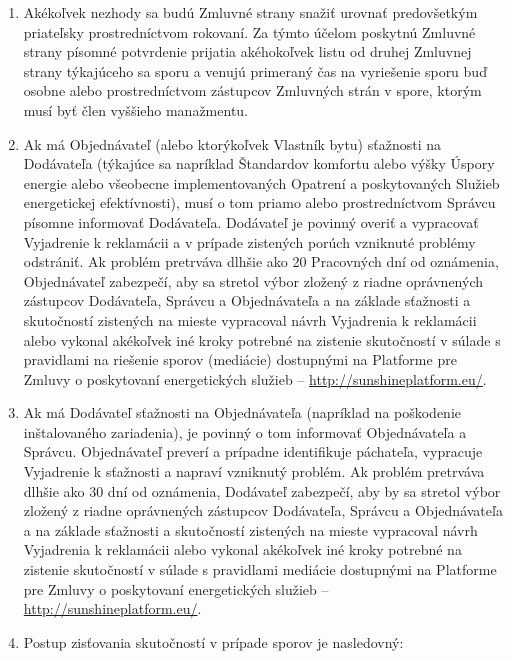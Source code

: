 \begin{multicols}{2}
\begin{enumerate}
\def\labelenumi{\arabic{enumi}.}
\item
  Akékoľvek nezhody sa budú Zmluvné strany snažiť urovnať predovšetkým
  priateľsky prostredníctvom rokovaní. Za týmto účelom poskytnú Zmluvné
  strany písomné potvrdenie prijatia akéhokoľvek listu od druhej
  Zmluvnej strany týkajúceho sa sporu a venujú primeraný čas na
  vyriešenie sporu buď osobne alebo prostredníctvom zástupcov Zmluvných
  strán v spore, ktorým musí byť člen vyššieho manažmentu.
\item
  Ak má Objednávateľ (alebo ktorýkoľvek Vlastník bytu) sťažnosti na
  Dodávateľa (týkajúce sa napríklad Štandardov komfortu alebo výšky
  Úspory energie alebo všeobecne implementovaných Opatrení a
  poskytovaných Služieb energetickej efektívnosti), musí o tom priamo
  alebo prostredníctvom Správcu písomne informovať Dodávateľa. Dodávateľ
  je povinný overiť a vypracovať Vyjadrenie k reklamácii a v prípade
  zistených porúch vzniknuté problémy odstrániť. Ak problém pretrváva
  dlhšie ako 20 Pracovných dní od oznámenia, Objednávateľ zabezpečí, aby
  sa stretol výbor zložený z riadne oprávnených zástupcov Dodávateľa,
  Správcu a Objednávateľa a na základe sťažnosti a skutočností zistených
  na mieste vypracoval návrh Vyjadrenia k reklamácii alebo vykonal
  akékoľvek iné kroky potrebné na zistenie skutočností v súlade s
  pravidlami na riešenie sporov (mediácie) dostupnými na Platforme pre
  Zmluvy o poskytovaní energetických služieb --
  \href{http://www.sharex.lv}{http://sunshineplatform.eu/}.
\item
  Ak má Dodávateľ sťažnosti na Objednávateľa (napríklad na poškodenie
  inštalovaného zariadenia), je povinný o tom informovať Objednávateľa a
  Správcu. Objednávateľ preverí a prípadne identifikuje páchateľa,
  vypracuje Vyjadrenie k sťažnosti a napraví vzniknutý problém. Ak
  problém pretrváva dlhšie ako 30 dní od oznámenia, Dodávateľ zabezpečí,
  aby by sa stretol výbor zložený z riadne oprávnených zástupcov
  Dodávateľa, Správcu a Objednávateľa a na základe sťažnosti a
  skutočností zistených na mieste vypracoval návrh Vyjadrenia k
  reklamácii alebo vykonal akékoľvek iné kroky potrebné na zistenie
  skutočností v súlade s pravidlami mediácie dostupnými na Platforme pre
  Zmluvy o poskytovaní energetických služieb --
  \href{http://www.sharex.lv}{http://sunshineplatform.eu/}.
\item
  Postup zisťovania skutočností v prípade sporov je nasledovný:


\end{enumerate}
\end{multicols}
